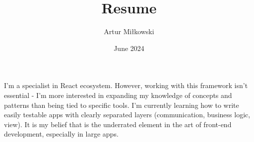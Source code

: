 \documentclass{my_cv}
\title{Resume}
\author{Artur Miłkowski}
\date{June 2024}
\begin{document}
\begin{multicols}{3}
    \columnbreak
    \columnbreak
\end{multicols}

\begin{multicols}{2}

    \columnbreak
    \begin{spacing}{1.5}
        I’m a specialist in React ecosystem. However, working with this framework isn’t essential - I’m more interested in expanding my knowledge of concepts and patterns than being tied to specific tools. I’m currently learning how to write easily testable apps with clearly separated layers (communication, business logic, view). It is my belief that is the underrated element in the art of front-end development, especially in large apps.
    \end{spacing}
\end{multicols}

\vspace{1em}
\setlength{\columnsep}{1cm}
\end{document}
